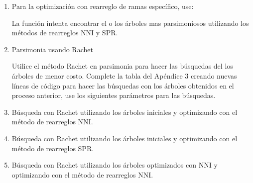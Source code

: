 \begin{itemize}
\begin{enumerate}
\item Para la optimizaci\'on con rearreglo de ramas espec\'ifico, use:



La funci\'on  intenta encontrar el o los \'arboles mas parsimoniosos utilizando los m\'etodos de rearreglos NNI y SPR.


\item{Parsimonia usando Rachet} 

Utilice el m\'etodo Rachet en parsimonia para hacer las b\'usquedas del los \'arboles de menor costo. Complete la tabla del Ap\'endice 3 creando nuevas l\'ineas de c\'odigo para hacer las b\'usquedas con los \'arboles obtenidos en el proceso anterior,  use los siguientes par\'ametros para las  b\'usquedas.

\item B\'usqueda con Rachet utilizando los \'arboles iniciales y optimizando con el m\'etodo de rearreglos NNI.


\item B\'usqueda con Rachet utilizando los \'arboles iniciales y optimizando con el m\'etodo de rearreglos SPR.


\item B\'usqueda con Rachet utilizando los \'arboles optimizados con NNI y optimizando con el m\'etodo de rearreglos NNI.


\end{enumerate}
\end{itemize}
